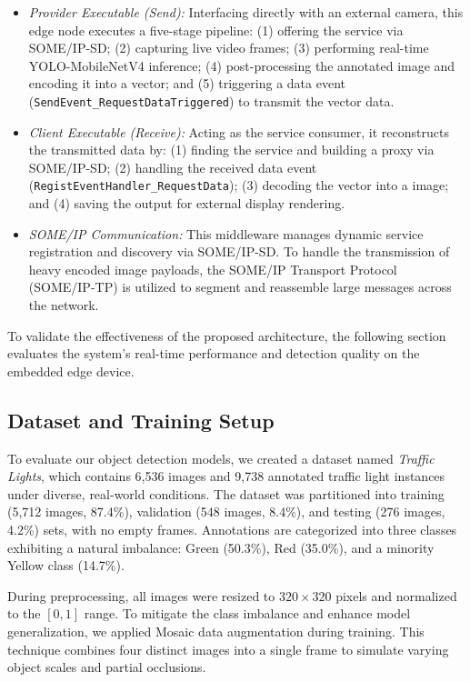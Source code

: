 \begin{itemize}
    \item \textit{Provider Executable (Send):} Interfacing directly with an external camera, this edge node executes a five-stage pipeline: (1) offering the service via SOME/IP-SD; (2) capturing live video frames; (3) performing real-time YOLO-MobileNetV4 inference; (4) post-processing the annotated image and encoding it into a vector; and (5) triggering a data event (\texttt{SendEvent\_RequestDataTriggered}) to transmit the vector data.

    \item \textit{Client Executable (Receive):} Acting as the service consumer, it reconstructs the transmitted data by: (1) finding the service and building a proxy via SOME/IP-SD; (2) handling the received data event (\texttt{RegistEventHandler\_RequestData}); (3) decoding the vector into a image; and (4) saving the output for external display rendering.

    \item \textit{SOME/IP Communication:} This middleware manages dynamic service registration and discovery via SOME/IP-SD. To handle the transmission of heavy encoded image payloads, the SOME/IP Transport Protocol (SOME/IP-TP) is utilized to segment and reassemble large messages across the network.
\end{itemize}

To validate the effectiveness of the proposed architecture, the following section evaluates the system's real-time performance and detection quality on the embedded edge device.

\subsection{Dataset and Training Setup}

To evaluate our object detection models, we created a dataset named \textit{Traffic Lights}, which contains 6,536 images and 9,738 annotated traffic light instances under diverse, real-world conditions. The dataset was partitioned into training (5,712 images, 87.4\%), validation (548 images, 8.4\%), and testing (276 images, 4.2\%) sets, with no empty frames. Annotations are categorized into three classes exhibiting a natural imbalance: Green (50.3\%), Red (35.0\%), and a minority Yellow class (14.7\%).

During preprocessing, all images were resized to $320 \times 320$ pixels and normalized to the $[0, 1]$ range. To mitigate the class imbalance and enhance model generalization, we applied Mosaic data augmentation during training. This technique combines four distinct images into a single frame to simulate varying object scales and partial occlusions. 

